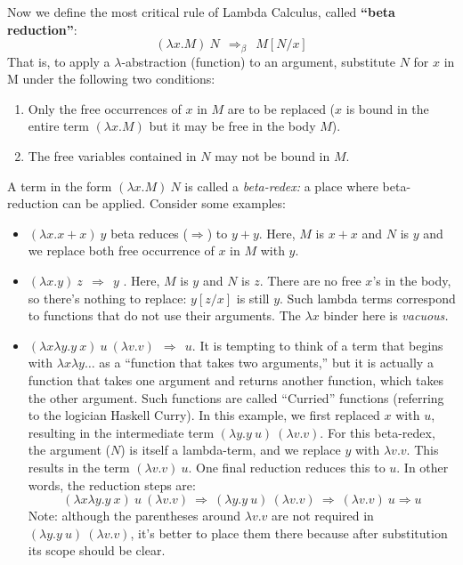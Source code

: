 Now we define the most critical rule of Lambda Calculus, 
called {\bf ``beta reduction''}:
$$ (\lambda x.M)~N  ~~\Rightarrow_\beta~~  M[N/x]$$
That is, to apply a $\lambda$-abstraction (function) to an argument, substitute
$N$ for $x$ in M under the following two conditions:
\begin{enumerate}
\item Only the free occurrences of $x$ in $M$ are to be replaced ($x$ is bound
  in the entire term $(\lambda x.M)$ but it may be free in the body $M$).
\item The free variables contained in $N$ may not be bound in $M$.
\end{enumerate}
A term in the form $(\lambda x.M)~N$ is called a {\em beta-redex:\/} a place
where beta-reduction can be applied.
Consider some examples:
\begin{itemize}
  \item $(\lambda x.x+x)~ y$ beta reduces ($\Rightarrow$) to $y+y$.  Here, $M$ is $x+x$
  and $N$ is $y$ and we replace both free occurrence of $x$ in $M$ with $y$.

\item  $(\lambda x.y)~z  ~~\Rightarrow~~ y$ .  Here, $M$ is $y$ and $N$ is $z$.  There
  are no free $x$'s in the body, so there's nothing to replace: $y[z/x]$ is still $y$.
  Such lambda terms correspond to functions that do not use their arguments.
  The $\lambda x$ binder here is {\em vacuous.\/}

\item   $(\lambda x\lambda y.y~ x)~ u ~(\lambda v.v) ~~\Rightarrow ~~ u$.  It is tempting
  to think of a term that begins with $\lambda x\lambda y\ldots$ as a ``function that takes two arguments,'' but it
  is actually a function that takes one argument and returns another function,
  which takes the other argument.  Such functions are called ``Curried'' functions
  (referring to the logician Haskell Curry).  In this example, we first
  replaced $x$ with $u$, resulting in the intermediate term
  $(\lambda y.y~u)~(\lambda v.v)$.  For this beta-redex, the argument ($N$) is
  itself a lambda-term, and we replace $y$ with $\lambda v.v$.  This results
  in the term $(\lambda v.v)~u$.  One final reduction reduces this to $u$.
  In other words, the reduction steps are:
  $$(\lambda x\lambda y.y~ x)~ u~ (\lambda v.v) ~\Rightarrow ~
  (\lambda y.y~u)~(\lambda v.v) ~\Rightarrow ~ (\lambda v.v)~u \Rightarrow u$$
  Note: although the parentheses around $\lambda v.v$ are not required
  in $(\lambda y.y~u)~(\lambda v.v)$, it's better to place them there because
  after substitution its scope should be clear.


\end{itemize}
